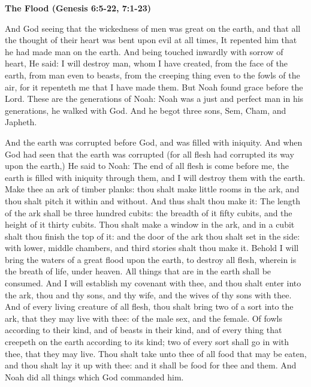 \textbf{The Flood (Genesis 6:5-22, 7:1-23)}

And God seeing that the wickedness of men was great on the earth, and that all the thought of their heart was bent upon
evil at all times, It repented him that he had made man on the earth. And being touched inwardly with sorrow of heart,
He said: I will destroy man, whom I have created, from the face of the earth, from man even to beasts, from the
creeping thing even to the fowls of the air, for it repenteth me that I have made them. But Noah found grace before the
Lord. These are the generations of Noah: Noah was a just and perfect man in his generations, he walked with God. And he
begot three sons, Sem, Cham, and Japheth.

And the earth was corrupted before God, and was filled with iniquity. And when God had seen that the earth was corrupted
(for all flesh had corrupted its way upon the earth,) He said to Noah: The end of all flesh is come before me, the
earth is filled with iniquity through them, and I will destroy them with the earth. Make thee an ark of timber planks:
thou shalt make little rooms in the ark, and thou shalt pitch it within and without. And thus shalt thou make it: The
length of the ark shall be three hundred cubits: the breadth of it fifty cubits, and the height of it thirty cubits.
Thou shalt make a window in the ark, and in a cubit shalt thou finish the top of it: and the door of the ark thou shalt
set in the side: with lower, middle chambers, and third stories shalt thou make it. Behold I will bring the waters of a
great flood upon the earth, to destroy all flesh, wherein is the breath of life, under heaven. All things that are in
the earth shall be consumed. And I will establish my covenant with thee, and thou shalt enter into the ark, thou and
thy sons, and thy wife, and the wives of thy sons with thee. And of every living creature of all flesh, thou shalt
bring two of a sort into the ark, that they may live with thee: of the male sex, and the female. Of fowls according to
their kind, and of beasts in their kind, and of every thing that creepeth on the earth according to its kind; two of
every sort shall go in with thee, that they may live. Thou shalt take unto thee of all food that may be eaten, and thou
shalt lay it up with thee: and it shall be food for thee and them. And Noah did all things which God commanded him.

